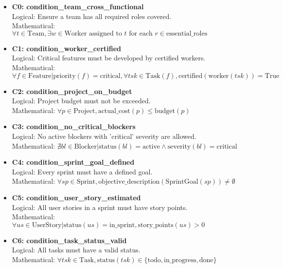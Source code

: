\documentclass[11pt]{article}
\begin{document}
\begin{itemize}
    \item \textbf{C0: condition\_team\_cross\_functional} \\
    Logical: Ensure a team has all required roles covered. \\
    Mathematical: $\forall t \in \text{Team}, \exists w \in \text{Worker} \text{ assigned to } t \text{ for each } r \in \text{essential\_roles}$
    
    \item \textbf{C1: condition\_worker\_certified} \\
    Logical: Critical features must be developed by certified workers. \\
    Mathematical: $\forall f \in \text{Feature} | \text{priority}(f) = \text{critical}, \forall tsk \in \text{Task}(f), \text{certified}(\text{worker}(tsk)) = \text{True}$
    
    \item \textbf{C2: condition\_project\_on\_budget} \\
    Logical: Project budget must not be exceeded. \\
    Mathematical: $\forall p \in \text{Project}, \text{actual\_cost}(p) \leq \text{budget}(p)$
    
    \item \textbf{C3: condition\_no\_critical\_blockers} \\
    Logical: No active blockers with 'critical' severity are allowed. \\
    Mathematical: $\nexists bl \in \text{Blocker} | \text{status}(bl) = \text{active} \wedge \text{severity}(bl) = \text{critical}$
    
    \item \textbf{C4: condition\_sprint\_goal\_defined} \\
    Logical: Every sprint must have a defined goal. \\
    Mathematical: $\forall sp \in \text{Sprint}, \text{objective\_description}(\text{SprintGoal}(sp)) \neq \emptyset$
    
    \item \textbf{C5: condition\_user\_story\_estimated} \\
    Logical: All user stories in a sprint must have story points. \\
    Mathematical: $\forall us \in \text{UserStory} | \text{status}(us) = \text{in\_sprint}, \text{story\_points}(us) > 0$
    
    \item \textbf{C6: condition\_task\_status\_valid} \\
    Logical: All tasks must have a valid status. \\
    Mathematical: $\forall tsk \in \text{Task}, \text{status}(tsk) \in \{\text{todo}, \text{in\_progress}, \text{done}\}$
    

\end{itemize}
\end{document}
